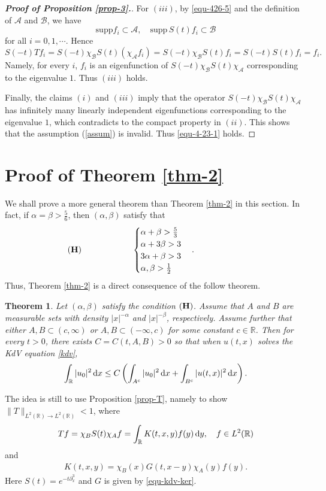 \documentclass[12pt]{amsart}
\def\R {\mathbb{R}}
\def\d{{\,\rm d}}
\newtheorem{theorem}[proposition]{Theorem}
\theoremstyle{definition}
\numberwithin{equation}{section}
\begin{document}
\begin{proof}[\bf \textit{Proof of Proposition \ref{prop-3}}.]
For $(iii)$,  by \eqref{equ-426-5} and the definition of $\mathcal {A}$ and $\mathcal {B}$, we have
$$
\mathrm{supp } f_i\subset \mathcal {A}, \quad \mathrm{supp }\,  S(t)f_i\subset \mathcal {B}
$$
for all $i=0,1,\cdots$. Hence
$$
S(-t)Tf_i=S(-t)\chi_{\mathcal {B}}S(t)(\chi_{\mathcal {A}}f_i)=S(-t)\chi_{\mathcal {B}}S(t)f_i=S(-t)S(t)f_i=f_i.
$$
Namely, for every $i$, $f_i$ is an eigenfunction of $S(-t)\chi_\mathcal {B}S(t)\chi_\mathcal {A}$ corresponding to the eigenvalue $1$. Thus $(iii)$ holds.

Finally, the claims $(i)$ and $(iii)$ imply that   the  operator $S(-t)\chi_\mathcal {B}S(t)\chi_\mathcal {A}$  has infinitely many linearly independent eigenfunctions corresponding to the eigenvalue $1$, which contradicts to the compact property in $(ii)$. This shows that the assumption  (\ref{assum}) is invalid. Thus \eqref{equ-4-23-1} holds.
\end{proof}

\section{Proof of Theorem \ref{thm-2}}

We shall prove a more general theorem than Theorem \ref{thm-2} in this section. In fact, if $\alpha=\beta>\frac{5}{6}$, then $(\alpha,\beta)$ satisfy that
$$
  ({\bf H}) \qquad   \qquad \qquad   \begin{cases}
          \alpha+\beta>\frac{5}{3}&\\
          \alpha+3\beta>3&\\
          3\alpha+\beta>3&\\
          \alpha,\beta>\frac{1}{2}&
       \end{cases}.
        \qquad \qquad \qquad
$$
Thus, Theorem \ref{thm-2} is a direct consequence of the follow theorem.

\begin{theorem}\label{thm-4}
Let $(\alpha,\beta)$ satisfy the condition $({\bf H})$. Assume that  $A$ and $B$ are measurable sets with density  $|x|^{-\alpha}$ and $|x|^{-\beta}$, respectively. Assume further that either  $A,B\subset (c,\infty)$ or $A,B\subset (-\infty,c)$  for some constant $c\in \R$. Then for every $t>0$, there exists $C=C(t,A,B)>0$ so that when $u(t,x)$  solves the KdV equation \eqref{kdv},
$$
    \int_\R |u_0|^2\d x \leq C\left( \int_{A^c}|u_0|^2\d x + \int_{B^c}|u(t,x)|^2\d x \right).
$$
\end{theorem}

The idea is still to use Proposition \ref{prop-T}, namely to show $\|T\|_{L^2(\R)\to L^2(\R)}<1$, where
\begin{align}\label{equ-51-1}
Tf=\chi_BS(t)\chi_A f = \int_\R K(t,x,y)f(y)\d y, \quad f\in L^2(\R)
\end{align}
and
\begin{align}\label{equ-51-2}
K(t,x,y)=\chi_B(x)G(t,x-y)\chi_A(y)f(y).
\end{align}
Here $S(t)=e^{-t\partial_x^3}$ and $G$ is given by \eqref{equ-kdv-ker}.
\end{document}
